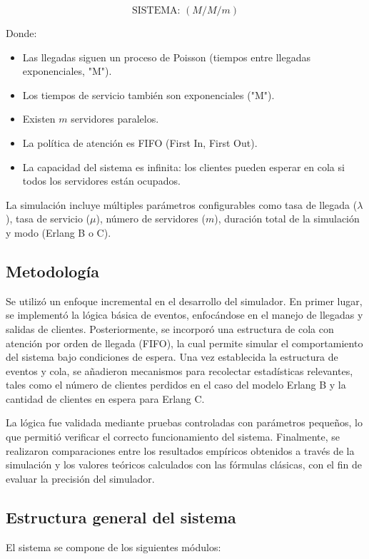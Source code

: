 \documentclass{article}
\begin{document}
\[
\text{SISTEMA: } (M / M / m)
\]

Donde:
\begin{itemize}
    \item Las llegadas siguen un proceso de Poisson (tiempos entre llegadas exponenciales, "M").
    \item Los tiempos de servicio también son exponenciales ("M").
    \item Existen $m$ servidores paralelos.
    \item La política de atención es FIFO (First In, First Out).
    \item La capacidad del sistema es infinita: los clientes pueden esperar en cola si todos los servidores están ocupados.
\end{itemize}


La simulación incluye múltiples parámetros configurables como tasa de llegada ($\lambda$), tasa de servicio ($\mu$), número de servidores ($m$), duración total de la simulación y modo (Erlang B o C).

\subsection{Metodología}

Se utilizó un enfoque incremental en el desarrollo del simulador. En primer lugar, se implementó la lógica básica de eventos, enfocándose en el manejo de llegadas y salidas de clientes. Posteriormente, se incorporó una estructura de cola con atención por orden de llegada (FIFO), la cual permite simular el comportamiento del sistema bajo condiciones de espera. Una vez establecida la estructura de eventos y cola, se añadieron mecanismos para recolectar estadísticas relevantes, tales como el número de clientes perdidos en el caso del modelo Erlang B y la cantidad de clientes en espera para Erlang C.


La lógica fue validada mediante pruebas controladas con parámetros pequeños, lo que permitió verificar el correcto funcionamiento del sistema. Finalmente, se realizaron comparaciones entre los resultados empíricos obtenidos a través de la simulación y los valores teóricos calculados con las fórmulas clásicas, con el fin de evaluar la precisión del simulador.

\subsection{Estructura general del sistema}

El sistema se compone de los siguientes módulos:
\end{document}
